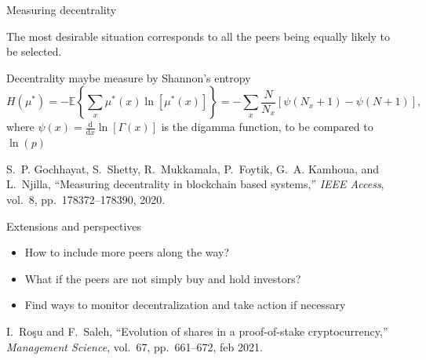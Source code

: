 \documentclass{beamer}
\begin{document}
\begin{frame}{Measuring decentrality}
\scriptsize
\begin{tcolorbox}[enhanced,drop shadow, title=Fact]
The most desirable situation corresponds to all the peers being equally likely to be selected. 
\end{tcolorbox}
Decentrality maybe measure by Shannon's entropy
$$
H(\mu^\ast) = -\mathbb{E}\left\{\sum_x \mu^\ast(x)\ln[\mu^\ast(x)]\right\} = -\sum_x\frac{N}{N_x}\left[\psi(N_x+1)-\psi(N+1)\right],
$$
where $\psi(x) = \frac{\text{d}}{\text{d}x}\ln[\Gamma(x)]$ is the digamma function, to be compared to $\ln(p)$
\tiny
\begin{thebibliography}{1}

S.~P. Gochhayat, S.~Shetty, R.~Mukkamala, P.~Foytik, G.~A. Kamhoua, and
  L.~Njilla, ``Measuring decentrality in blockchain based systems,'' {\em
  {IEEE} Access}, vol.~8, pp.~178372--178390, 2020.

\end{thebibliography}

\end{frame}
\begin{frame}{Extensions and perspectives}
\begin{itemize}
  \item How to include more peers along the way?
  \item What if the peers are not simply buy and hold investors?
  \item Find ways to monitor decentralization and take action if necessary
\end{itemize}
\tiny
\begin{thebibliography}{1}

I.~Ro{\c{s}}u and F.~Saleh, ``Evolution of shares in a proof-of-stake
  cryptocurrency,'' {\em Management Science}, vol.~67, pp.~661--672, feb 2021.
  \end{thebibliography} 

\end{frame}
\end{document}
